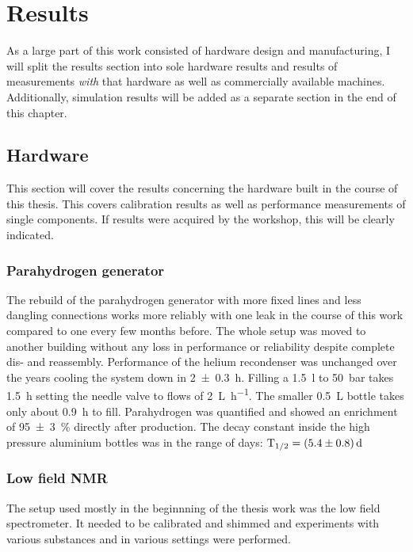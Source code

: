 \chapter{Results}\label{chap:results}
    As a large part of this work consisted of hardware design and manufacturing, I will split the results section into sole hardware results and results of measurements \textit{with} that hardware as well as commercially available machines. Additionally, simulation results will be added as a separate section in the end of this chapter.
\section{Hardware}
    This section will cover the results concerning the hardware built in the course of this thesis. This covers calibration results as well as performance measurements of single components. If results were acquired by the workshop, this will be clearly indicated.
    \subsection{Parahydrogen generator}
        The rebuild of the parahydrogen generator with more fixed lines and less dangling connections works more reliably with one leak in the course of this work compared to one every few months before. The whole setup was moved to another building without any loss in performance or reliability despite complete dis- and reassembly.
        Performance of the helium recondenser was unchanged over the years cooling the system down in \SI{2\pm0.3}{\hour}. Filling a \SI{1.5}{\l} to \SI{50}{\bar} takes \SI{1.5}{\hour} setting the needle valve to flows of \SI{2}{\liter\per\hour}. The smaller \SI{0.5}{\liter} bottle takes only about \SI{0.9}{\hour} to fill.
        Parahydrogen was quantified and showed an enrichment of \SI{95\pm3}{\%} directly after production. The decay constant inside the high pressure aluminium bottles was in the range of days: $\mathrm{T}_{1/2} = \SI{5.4\pm 0.8}{\day}$
    \subsection{Low field NMR}
        The setup used mostly in the beginnning of the thesis work was the low field spectrometer. It needed to be calibrated and shimmed and experiments with various substances and in various settings were performed.

